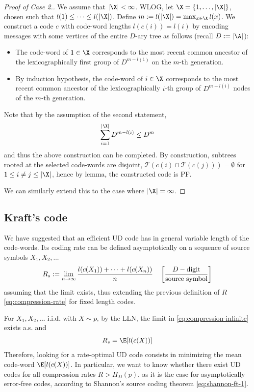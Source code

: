 \documentclass[toc, titlepaged]{../cs-classes/cs-classes}
\begin{document}
\begin{proof}[Proof of Case 2.]
    We assume that $|\X|<\infty$. WLOG, let $\X=\{1, \dots, |\X|\}$, chosen such that $l(1)\leq\dots\leq l(|\X|)$. Define $m:=l(|\X|)=\max_{x\in\X} l(x)$. We construct a code $c$ with code-word lengths $l(c(i))=l(i)$ by encoding messages with some vertices of the entire $D$-ary tree as follows (recall $D:=|\A|$):
    \begin{itemize}
        \item The code-word of $1\in\X$ corresponds to the most recent common ancestor of the lexicographically first group of $D^{m-l(1)}$ on the $m$-th generation.
        \item By induction hypothesis, the code-word of $i\in\X$ corresponds to the most recent common ancestor of the lexicographically $i$-th group of $D^{m-l(i)}$ nodes of the $m$-th generation.
    \end{itemize}

    Note that by the assumption of the second statement,
    \begin{equation*}
        \sum_{i=1}^{|\X|}D^{m-l(i)} \leq D^m
    \end{equation*}
    and thus the above construction can be completed. By construction, subtrees rooted at the selected code-words are disjoint, $\mathcal{T}(c(i)\cap\mathcal{T}(c(j)))=\emptyset$ for $1\leq i\neq j\leq |\X|$, hence by lemma, the constructed code is PF.
    
    We can similarly extend this to the case where $|\X|=\infty$.
\end{proof}

\subsection{Kraft's code}
We have suggested that an efficient UD code has in general variable length of the code-words. Its coding rate can be defined asymptotically on a sequence of source symbols $X_1, X_2, \dots$
\begin{equation}
    \label{eq:compression-infinite}
    R_s := \lim_{n\to\infty} \frac{l(c(X_1))+\dots+l(c(X_n))}{n} \quad \left[\frac{D-\textnormal{digit}}{\textnormal{source symbol}}\right]
\end{equation}
assuming that the limit exists, thus extending the previous definition of $R$ \eqref{eq:compression-rate} for fixed length codes.

For $X_1, X_2, \dots$ i.i.d. with $X\sim p$, by the LLN, the limit in \eqref{eq:compression-infinite} exists a.s. and
\begin{equation*}
    R_s = \E[l(c(X))]
\end{equation*}
Therefore, looking for a rate-optimal UD code consists in minimizing the mean code-word $\E[l(c(X))]$. In particular, we want to know whether there exist UD codes for all compression rates $R>H_D(p)$, as it is the case for asymptotically error-free codes, according to Shannon's source coding theorem \eqref{eq:shannon-ft-1}.
\end{document}
